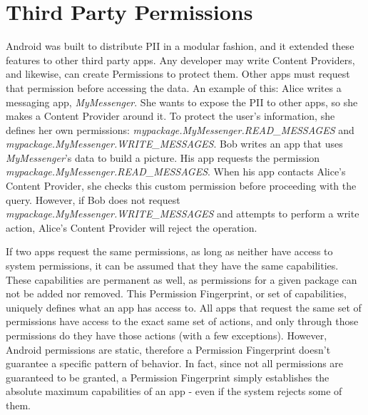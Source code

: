 \section{Third Party Permissions}
\begin{sloppypar}
Android was built to distribute PII in a modular fashion, and it extended these features to other third party apps. Any developer may write Content Providers, and likewise, can create Permissions to protect them. Other apps must request that permission before accessing the data. An example of this: Alice writes a messaging app, \textit{MyMessenger}. She wants to expose the PII to other apps, so she makes a Content Provider around it. To protect the user's information, she defines her own permissions: \textit{mypackage.MyMessenger.READ\_MESSAGES} and \textit{mypackage.MyMessenger.WRITE\_MESSAGES}. Bob writes an app that uses \textit{MyMessenger}'s data to build a picture. His app requests the permission \textit{mypackage.MyMessenger.READ\_MESSAGES}. When his app contacts Alice's Content Provider, she checks this custom permission before proceeding with the query. However, if Bob does not request \textit{mypackage.MyMessenger.WRITE\_MESSAGES} and attempts to perform a write action, Alice's Content Provider will reject the operation.
\end{sloppypar}


If two apps request the same permissions, as long as neither have access to system permissions, it can be assumed that they have the same capabilities. These capabilities are permanent as well, as permissions for a given package can not be added nor removed. This Permission Fingerprint, or set of capabilities, uniquely defines what an app has access to. All apps that request the same set of permissions have access to the exact same set of actions, and only through those permissions do they have those actions (with a few exceptions). However, Android permissions are static, therefore a Permission Fingerprint doesn't guarantee a specific pattern of behavior. In fact, since not all permissions are guaranteed to be granted, a Permission Fingerprint simply establishes the absolute maximum capabilities of an app - even if the system rejects some of them.
